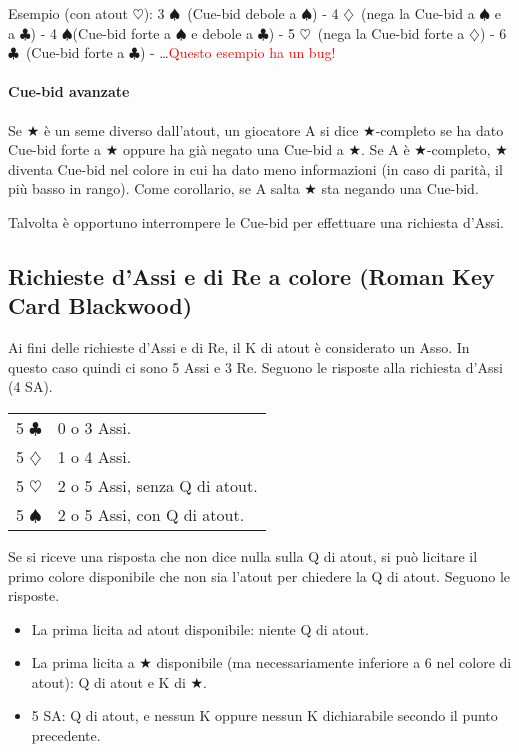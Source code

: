 \documentclass[a4paper,10pt]{article}
\renewcommand{\c}{$\clubsuit$\xspace}
\renewcommand{\d}{$\diamondsuit$\xspace}
\newcommand{\h}{$\heartsuit$\xspace}
\newcommand{\s}{$\spadesuit$\xspace}
\renewcommand{\j}{$\bigstar$\xspace}
\newcommand{\sa}{SA\xspace}
\newcommand{\smallspace}{\vskip0.3cm}
\newcommand{\note}[1]{\textcolor{red}{#1}}
\newenvironment{twocol}
  {\smallspace\noindent\begin{tabular}{l p{0.78\textwidth}}}
  {\end{tabular}\smallspace}
\begin{document}
Esempio (con atout \h): 3 \s\  (Cue-bid debole a \s) - 4 \d\ (nega la Cue-bid a \s e a \c) - 4 \s (Cue-bid forte a \s e debole a \c) - 5 \h\ (nega la Cue-bid forte a \d) - 6 \c\ (Cue-bid forte a \c) - \dots \note{Questo esempio ha un bug!}

\paragraph{Cue-bid avanzate} Se \j è un seme diverso dall'atout, un giocatore A si dice \j-completo se ha dato Cue-bid forte a \j oppure ha già negato una Cue-bid a \j. Se A è \j-completo, \j diventa Cue-bid nel colore in cui ha dato meno informazioni (in caso di parità, il più basso in rango). Come corollario, se A salta \j sta negando una Cue-bid.
\vspace{4mm}

Talvolta è opportuno interrompere le Cue-bid per effettuare una richiesta d'Assi.


\subsection{Richieste d'Assi e di Re a colore (Roman Key Card Blackwood)}

Ai fini delle richieste d'Assi e di Re, il K di atout è considerato un Asso. In questo caso quindi ci sono 5 Assi e 3 Re. Seguono le risposte alla richiesta d'Assi (4 \sa).

\begin{twocol}
5 \c & 0 o 3 Assi.\\
5 \d & 1 o 4 Assi.\\
5 \h & 2 o 5 Assi, senza Q di atout.\\
5 \s & 2 o 5 Assi, con Q di atout.\\
\end{twocol}

\noindent Se si riceve una risposta che non dice nulla sulla Q di atout, si può licitare il primo colore disponibile che non sia l'atout per chiedere la Q di atout. Seguono le risposte.

\begin{itemize}
 \item La prima licita ad atout disponibile: niente Q di atout.
 \item La prima licita a \j disponibile (ma necessariamente inferiore a 6 nel colore di atout): Q di atout e K di \j.
 \item 5 \sa: Q di atout, e nessun K oppure nessun K dichiarabile secondo il punto precedente.
\end{itemize}
\end{document}
